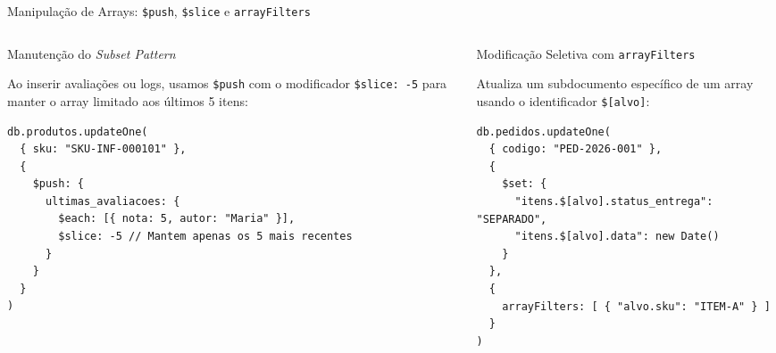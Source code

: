 \begin{frame}[fragile]{Manipulação de Arrays: \texttt{\$push}, \texttt{\$slice} e \texttt{arrayFilters}}
  \vspace{0.05cm}
  \begin{columns}[t]
    \begin{column}{0.48\textwidth}
      \alert{Manutenção do \textit{Subset Pattern}}\par
      \scriptsize
      Ao inserir avaliações ou logs, usamos \texttt{\$push} com o modificador \texttt{\$slice: -5} para manter o array limitado aos últimos 5 itens:
      \begin{lstlisting}[language=mongosh]
db.produtos.updateOne(
  { sku: "SKU-INF-000101" },
  {
    $push: {
      ultimas_avaliacoes: {
        $each: [{ nota: 5, autor: "Maria" }],
        $slice: -5 // Mantem apenas os 5 mais recentes
      }
    }
  }
)
      \end{lstlisting}
    \end{column}
    \begin{column}{0.48\textwidth}
      \alert{Modificação Seletiva com \texttt{arrayFilters}}\par
      \scriptsize
      Atualiza um subdocumento específico de um array usando o identificador \texttt{\$[alvo]}:
      \begin{lstlisting}[language=mongosh]
db.pedidos.updateOne(
  { codigo: "PED-2026-001" },
  {
    $set: {
      "itens.$[alvo].status_entrega": "SEPARADO",
      "itens.$[alvo].data": new Date()
    }
  },
  {
    arrayFilters: [ { "alvo.sku": "ITEM-A" } ]
  }
)
      \end{lstlisting}
    \end{column}
  \end{columns}
\end{frame}

